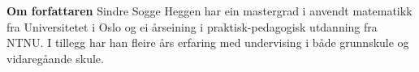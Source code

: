 


	\newpage
	\pagecolor{Aquamarine!30}
	\thispagestyle{empty}
	\textbf{Om forfattaren} \os
	Sindre Sogge Heggen har ein mastergrad i anvendt matematikk fra Universitetet i Oslo og ei årseining i praktisk-pedagogisk utdanning fra NTNU. I tillegg har han fleire års erfaring med undervising i både grunnskule og vidaregåande skule.
